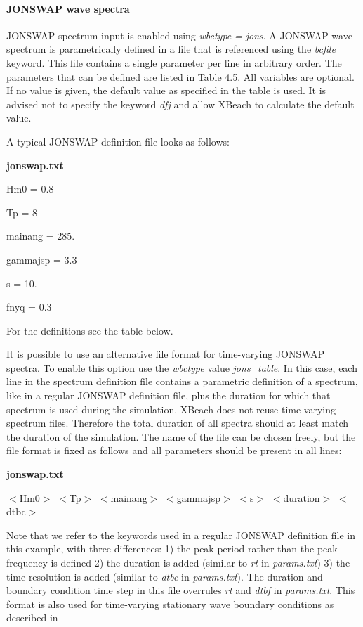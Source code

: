\documentclass{article}
\begin{document}
\paragraph{ JONSWAP wave spectra}

\noindent JONSWAP spectrum input is enabled using \textit{wbctype} \textit{= jons}. A JONSWAP wave spectrum is parametrically defined in a file that is referenced using the \textit{bcfile} keyword. This file contains a single parameter per line in arbitrary order. The parameters that can be defined are listed in Table 4.5. All variables are optional. If no value is given, the default value as specified in the table is used. It is advised not to specify the keyword \textit{dfj} and allow XBeach to calculate the default value.

\noindent A typical JONSWAP definition file looks as follows:

\noindent \textbf{jonswap.txt}

\noindent Hm0  = 0.8

\noindent Tp  = 8

\noindent mainang = 285.

\noindent gammajsp = 3.3

\noindent s  = 10.

\noindent fnyq  = 0.3

\noindent For the definitions see the table below.

\noindent It is possible to use an alternative file format for time-varying JONSWAP spectra. To enable this option use the \textit{wbctype} value \textit{jons\_table}. In this case, each line in the spectrum definition file contains a parametric definition of a spectrum, like in a regular JONSWAP definition file, plus the duration for which that spectrum is used during the simulation. XBeach does not reuse time-varying spectrum files. Therefore the total duration of all spectra should at least match the duration of the simulation. The name of the file can be chosen freely, but the file format is fixed as follows and all parameters should be present in all lines:

\noindent \textbf{jonswap.txt}

\noindent $<$Hm0$>$ $<$Tp$>$ $<$mainang$>$ $<$gammajsp$>$ $<$s$>$ $<$duration$>$ $<$dtbc$>$

\noindent Note that we refer to the keywords used in a regular JONSWAP definition file in this example, with three differences: 1) the peak period rather than the peak frequency is defined 2) the duration is added (similar to \textit{rt }in \textit{params.txt}) 3) the time resolution is added (similar to \textit{dtbc} in \textit{params.txt}). The duration and boundary condition time step in this file overrules \textit{rt} and \textit{dtbf} in \textit{params.txt}. This format is also used for time-varying stationary wave boundary conditions as described in 
\end{document}
